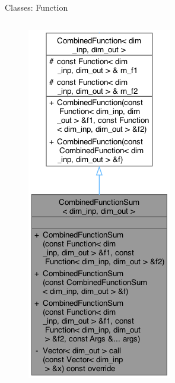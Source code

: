 \documentclass[8pt]{beamer}
\begin{document}
\begin{frame}{Classes: Function}
\begin{columns}
         {\centering \begin{figure} \centering \includegraphics[width=\textwidth]{img/uml_CombinedFunctionSum.png} \end{figure}}
    \end{columns}
\end{frame}
\end{document}
